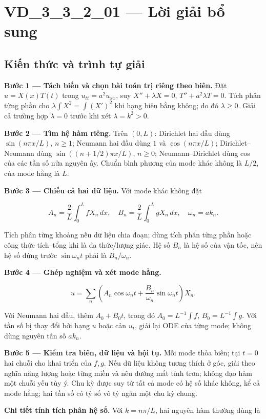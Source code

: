 \documentclass[10pt,a4paper]{article}
\begin{document}
\section*{VD\_3\_3\_2\_01 — Lời giải bổ sung}
\subsection*{Kiến thức và trình tự giải}
\textbf{Bước 1 — Tách biến và chọn bài toán trị riêng theo biên.} Đặt $u=X(x)T(t)$ trong $u_{tt}=a^2u_{xx}$, suy $X''+\lambda X=0$, $T''+a^2\lambda T=0$. Tích phân từng phần cho $\lambda\int X^2=\int (X')^2$ khi hạng biên bằng không; do đó $\lambda\ge0$. Giải cả trường hợp $\lambda=0$ trước khi xét $\lambda=k^2>0$.

\textbf{Bước 2 — Tìm hệ hàm riêng.} Trên $(0,L)$: Dirichlet hai đầu dùng $\sin(n\pi x/L)$, $n\ge1$; Neumann hai đầu dùng $1$ và $\cos(n\pi x/L)$; Dirichlet–Neumann dùng $\sin((n+1/2)\pi x/L)$, $n\ge0$; Neumann–Dirichlet dùng cos của các tần số nửa nguyên ấy. Chuẩn bình phương của mode khác không là $L/2$, của mode hằng là $L$.

\textbf{Bước 3 — Chiếu cả hai dữ liệu.} Với mode khác không đặt


\[
A_n=\frac2L\int_0^L fX_n\,dx,\quad B_n=\frac2L\int_0^L gX_n\,dx,\quad \omega_n=ak_n.
\]


Tích phân từng khoảng nếu dữ liệu chia đoạn; dùng tích phân từng phần hoặc công thức tích–tổng khi là đa thức/lượng giác. Hệ số $B_n$ là hệ số của vận tốc, nên hệ số đứng trước $\sin\omega_nt$ phải là $B_n/\omega_n$.

\textbf{Bước 4 — Ghép nghiệm và xét mode hằng.}


\[
u=\sum_n\left(A_n\cos\omega_nt+\frac{B_n}{\omega_n}\sin\omega_nt\right)X_n.
\]


Với Neumann hai đầu, thêm $A_0+B_0t$, trong đó $A_0=L^{-1}\int f$, $B_0=L^{-1}\int g$. Với tần số bị thay đổi bởi hạng $u$ hoặc cản $u_t$, giải lại ODE của từng mode; không dùng nguyên tần số $ak_n$.

\textbf{Bước 5 — Kiểm tra biên, dữ liệu và hội tụ.} Mỗi mode thỏa biên; tại $t=0$ hai chuỗi cho khai triển của $f,g$. Nếu dữ liệu không tương thích ở góc, giải theo nghĩa năng lượng hoặc từng miền và nêu đường mất tính trơn; không đạo hàm một chuỗi yếu tùy ý. Chu kỳ được suy từ tất cả mode có hệ số khác không, kể cả mode hằng; hai tần số có tỷ số vô tỷ ngăn một chu kỳ chung.

\textbf{Chi tiết tính tích phân hệ số.} Với $k=n\pi/L$, hai nguyên hàm thường dùng là
\end{document}
